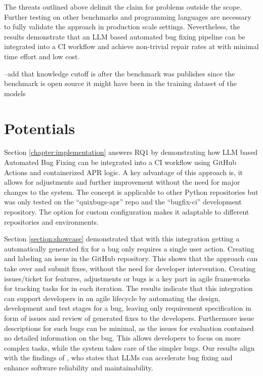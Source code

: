 The threats outlined above delimit the claim for problems outside the scope. Further testing on other benchmarks and programming languages are necessary to fully validate the approach in production scale settings. Nevertheless, the results demonstrate that an LLM based automated bug fixing pipeline can be integrated into a CI workflow and achieve non-trivial repair rates at with minimal time effort and low cost.

--add that knowledge cutoff is after the benchmark was publishes since the benchmark is open source it might have been in the training dataset of the models

\section{Potentials}

Section \ref{chapter:implementation} answers RQ1 by demonstrating how LLM based Automated Bug Fixing can be integrated into a CI workflow using GitHub Actions and containerized APR logic. A key advantage of this approach is, it allows for adjustments and further improvement without the need for major changes to the system.
The concept is applicable to other Python repositories but was only tested on the ``quixbugs-apr'' repo and the ``bugfix-ci'' development repository. The option for custom configuration makes it adaptable to different repositories and environments.

Section \ref{section:showcase} demonstrated that with this integration getting a automatically generated fix for a bug only requires a single user action. Creating and labeling an issue in the GitHub repository. This shows that the approach can take over and submit fixes, without the need for developer intervention. Creating issues/ticket for features, adjustments or bugs is a key part in agile frameworks for tracking tasks for in each iteration. %
The results indicate that this integration can support developers in an agile lifecycle by automating the design, development and test stages for a bug, leaving only requirement specification in form of issues and review of generated fixes to the developers. Furthermore issue descriptions for such bugs can be minimal, as the issues for evaluation contained no detailed information on the bug. This allows developers to focus on more complex tasks, while the system takes care of the simpler bugs. Our results align with the findings of \cite{houLargeLanguageModels2024}, who states that LLMs can accelerate bug fixing and enhance software reliability and maintainability.

